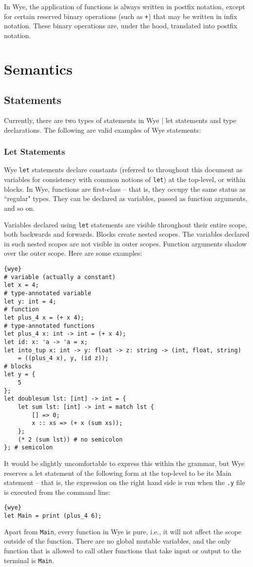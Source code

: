 \documentclass[a4paper, 12pt]{article}
\begin{document}
In Wye, the application of functions is always written in postfix notation, except for certain reserved binary operations (such as \texttt{+}) that may be written in infix notation. These binary operations are, under the hood, translated into postfix notation.

\section{Semantics}

\subsection{Statements}
Currently, there are two types of statements in Wye | let statements and type declarations. The following are valid examples of Wye statements:

\subsubsection{Let Statements}
Wye \texttt{let} statements declare constants (referred to throughout this document as variables for consistency with common notions of \texttt{let}) at the top-level, or within blocks. In Wye, functions are first-class -- that is, they occupy the same status as ``regular" types. They can be declared as variables, passed as function arguments, and so on.

Variables declared using \texttt{let} statements are visible throughout their entire scope, both backwards and forwards. Blocks create nested scopes. The variables declared in such nested scopes are not visible in outer scopes. Function arguments shadow over the outer scope. Here are some examples:
\begin{lstlisting}{wye}
# variable (actually a constant)
let x = 4;
# type-annotated variable
let y: int = 4;
# function
let plus_4 x = (+ x 4);
# type-annotated functions
let plus_4 x: int -> int = (+ x 4);
let id: x: 'a -> 'a = x;
let into_tup x: int -> y: float -> z: string -> (int, float, string)
	= ((plus_4 x), y, (id z));
# blocks
let y = {
	5
};
let doublesum lst: [int] -> int = {
	let sum lst: [int] -> int = match lst {
		[] => 0;
		x :: xs => (+ x (sum xs));
	};
	(* 2 (sum lst)) # no semicolon
}; # semicolon
\end{lstlisting}
It would be slightly uncomfortable to express this within the grammar, but Wye reserves a let statement of the following form at the top-level to be its Main statement -- that is, the expression on the right hand side is run when the \texttt{.y} file is executed from the command line:
\begin{lstlisting}{wye}
let Main = print (plus_4 6);
\end{lstlisting}
Apart from \texttt{Main}, every function in Wye is pure, i.e., it will not affect the scope outside of the function. There are no global mutable variables, and the only function that is allowed to call other functions that take input or output to the terminal is \texttt{Main}.
\end{document}
